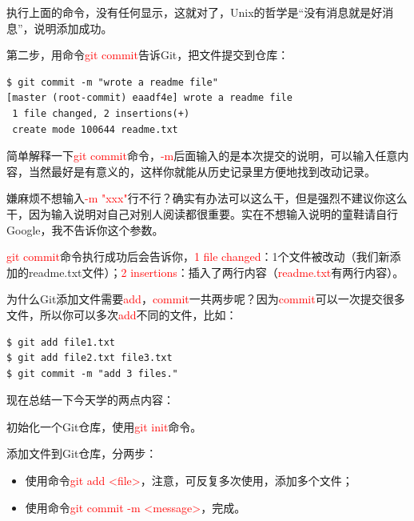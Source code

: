 执行上面的命令，没有任何显示，这就对了，Unix的哲学是“没有消息就是好消息”，说明添加成功。

第二步，用命令\textcolor{red}{git commit}告诉Git，把文件提交到仓库：

\begin{verbatim}
$ git commit -m "wrote a readme file"
[master (root-commit) eaadf4e] wrote a readme file
 1 file changed, 2 insertions(+)
 create mode 100644 readme.txt
\end{verbatim}

简单解释一下\textcolor{red}{git commit}命令，\textcolor{red}{-m}后面输入的是本次提交的说明，可以输入任意内容，当然最好是有意义的，这样你就能从历史记录里方便地找到改动记录。

嫌麻烦不想输入\textcolor{red}{-m "xxx"}行不行？确实有办法可以这么干，但是强烈不建议你这么干，因为输入说明对自己对别人阅读都很重要。实在不想输入说明的童鞋请自行Google，我不告诉你这个参数。

\textcolor{red}{git commit}命令执行成功后会告诉你，\textcolor{red}{1 file changed}：1个文件被改动（我们新添加的readme.txt文件）；\textcolor{red}{2 insertions}：插入了两行内容（\textcolor{red}{readme.txt}有两行内容）。

为什么Git添加文件需要\textcolor{red}{add}，\textcolor{red}{commit}一共两步呢？因为\textcolor{red}{commit}可以一次提交很多文件，所以你可以多次\textcolor{red}{add}不同的文件，比如：

\begin{verbatim}
$ git add file1.txt
$ git add file2.txt file3.txt
$ git commit -m "add 3 files."
\end{verbatim}


\begin{tcolorbox}

现在总结一下今天学的两点内容：

初始化一个Git仓库，使用\textcolor{red}{git init}命令。

添加文件到Git仓库，分两步：
  \begin{itemize}
    \item 使用命令\textcolor{red}{git add <file>}，注意，可反复多次使用，添加多个文件；
    \item 使用命令\textcolor{red}{git commit -m <message>}，完成。
  \end{itemize}
\end{tcolorbox}



